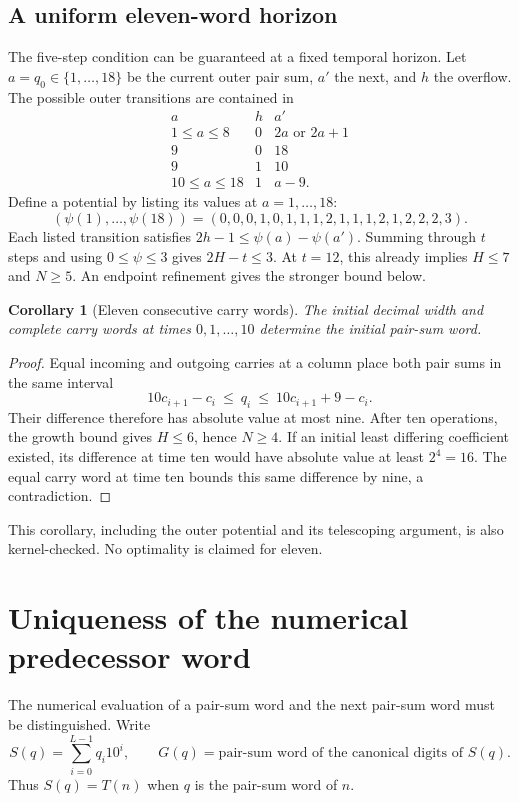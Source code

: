 \documentclass[11pt]{article}
\newtheorem{corollary}[theorem]{Corollary}
\begin{document}
\subsection{A uniform eleven-word horizon}
The five-step condition can be guaranteed at a fixed temporal horizon.
Let $a=q_0\in\{1,\ldots,18\}$ be the current outer pair sum, $a'$ the next,
and $h$ the overflow. The possible outer transitions are contained in
\[
\begin{array}{c|c|c}
a&h&a'\\\hline
1\leq a\leq8&0&2a\text{ or }2a+1\\
9&0&18\\
9&1&10\\
10\leq a\leq18&1&a-9.
\end{array}
\]
Define a potential by listing its values at $a=1,\ldots,18$:
\[
(\psi(1),\ldots,\psi(18))=
(0,0,0,1,0,1,1,1,2,1,1,1,2,1,2,2,2,3).
\]
Each listed transition satisfies $2h-1\leq\psi(a)-\psi(a')$.
Summing through $t$ steps and using $0\leq\psi\leq3$ gives
$2H-t\leq3$. At $t=12$, this already implies $H\leq7$ and $N\geq5$.
An endpoint refinement gives the stronger bound below.

\begin{corollary}[Eleven consecutive carry words]\label{cor:eleven}
The initial decimal width and complete carry words at times
$0,1,\ldots,10$ determine the initial pair-sum word.
\end{corollary}
\begin{proof}
Equal incoming and outgoing carries at a column place both pair sums in
the same interval
\[
10c_{i+1}-c_i\ \leq\ q_i\ \leq\ 10c_{i+1}+9-c_i.
\]
Their difference therefore has absolute value at most nine. After ten
operations, the growth bound gives $H\leq6$, hence $N\geq4$. If an initial
least differing coefficient existed, its difference at time ten would have
absolute value at least $2^4=16$. The equal carry word at time ten bounds
this same difference by nine, a contradiction.
\end{proof}
This corollary, including the outer potential and its telescoping argument,
is also kernel-checked. No optimality is claimed for eleven.

\section{Uniqueness of the numerical predecessor word}
The numerical evaluation of a pair-sum word and the next pair-sum word must
be distinguished. Write
\[
 S(q)=\sum_{i=0}^{L-1}q_i10^i,
 \qquad G(q)=\text{pair-sum word of the canonical digits of }S(q).
\]
Thus $S(q)=T(n)$ when $q$ is the pair-sum word of $n$.
\end{document}
